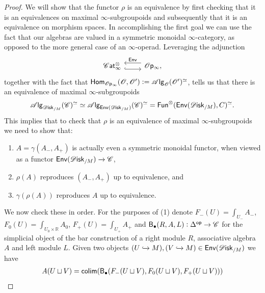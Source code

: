 \documentclass[../text]{subfiles}
\begin{document}
\begin{proof}
    We will show that the functor $\rho$ is an equivalence by first checking that it is an equivalences on maximal $\infty$-subgroupoids and subsequently that it is an equivalence on morphism spaces. In accomplishing the first goal we can use the fact that our algebras are valued in a symmetric monoidal $\infty$-category, as opposed to the more general case of an $\infty$-operad. Leveraging the adjunction 
    \begin{equation}
        \begin{tikzcd}
            \cat^{\otimes} \arrow[r, hook, yshift=-1ex] & \mathscr{O} \mathsf{p}_{\infty} \arrow[l, yshift=1ex, "\mathsf{Env}"'],
        \end{tikzcd}
    \end{equation}
    together with the fact that $\mathsf{Hom}_{\mathscr{O} \mathsf{p}_{\infty}} (\mathscr{O}, \mathscr{O}') := \mathscr{A} \mathsf{lg}_{\mathscr{O}} (\mathscr{O}')^{\simeq}$, tells us that there is an equivalence of maximal $\infty$-subgroupoids
    \begin{equation}
        \alg{\disk_{/M}} (\catC)^{\simeq} \simeq \alg{\mathsf{Env}(\disk_{/M})} (\catC)^{\simeq} = \mathsf{Fun}^{\otimes} (\mathsf{Env} (\disk_{/M}), C)^{\simeq}.
    \end{equation}
    This implies that to check that $\rho$ is an equivalence of maximal $\infty$-subgroupoids we need to show that:
    \begin{enumerate}
        \item $A = \gamma (A_-, A_+)$ is actually even a symmetric monoidal functor, when viewed as a functor $\mathsf{Env} (\disk_{/M}) \xrightarrow{} \catC$,
        \item $\rho(A)$ reproduces $(A_-, A_+)$ up to equivalence, and
        \item $\gamma (\rho (A))$ reproduces $A$ up to equivalence.
    \end{enumerate}
    We now check these in order. For the purposes of (1) denote $F_-(U) = \int_{U_-} A_-$, $F_0(U) = \int_{U_0 \times \mathbb{R}} A_0$, $F_+(U) = \int_{U_+} A_+$ and $\mathsf{B}_{\bullet} (R, A, L):\Delta^{\mathsf{op}} \rightarrow \mathscr{C}$ for the simplicial object of the bar construction of a right module $R$, associative algebra $A$ and left module $L$. Given two objects $(U \xhookrightarrow{} M), (V \xhookrightarrow{} M) \in \mathsf{Env}(\disk_{/M})$ we have 
    \begin{align}
        A(U \sqcup V) &= \mathsf{colim} (\mathsf{B}_{\bullet} (F_-(U \sqcup V), F_0(U \sqcup V), F_+(U \sqcup V)))\notag\\

\end{align}
\end{proof}
\end{document}

